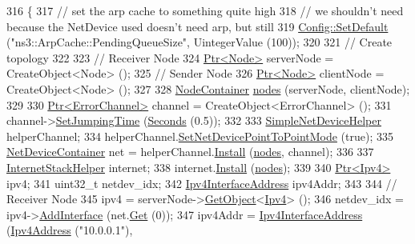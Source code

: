 \begin{DoxyCode}
316 \{
317   \textcolor{comment}{// set the arp cache to something quite high}
318   \textcolor{comment}{// we shouldn't need because the NetDevice used doesn't need arp, but still}
319   \hyperlink{group__config_ga2e7882df849d8ba4aaad31c934c40c06}{Config::SetDefault} (\textcolor{stringliteral}{"ns3::ArpCache::PendingQueueSize"}, UintegerValue (100));
320 
321   \textcolor{comment}{// Create topology}
322   
323    \textcolor{comment}{// Receiver Node}
324   \hyperlink{classns3_1_1Ptr}{Ptr<Node>} serverNode = CreateObject<Node> ();
325   \textcolor{comment}{// Sender Node}
326   \hyperlink{classns3_1_1Ptr}{Ptr<Node>} clientNode = CreateObject<Node> ();
327 
328   \hyperlink{classns3_1_1NodeContainer}{NodeContainer} \hyperlink{visualizer-ideas_8txt_a3e1b3808014a2c68ab0cd0182e041be2}{nodes} (serverNode, clientNode);
329 
330   \hyperlink{classns3_1_1Ptr}{Ptr<ErrorChannel>} channel = CreateObject<ErrorChannel> ();
331   channel->\hyperlink{classns3_1_1ErrorChannel_a907fdc086d939d84eb4e612d0eac1d84}{SetJumpingTime} (\hyperlink{group__timecivil_ga33c34b816f8ff6628e33d5c8e9713b9e}{Seconds} (0.5));
332 
333   \hyperlink{classns3_1_1SimpleNetDeviceHelper}{SimpleNetDeviceHelper} helperChannel;
334   helperChannel.\hyperlink{classns3_1_1SimpleNetDeviceHelper_a474460ba6942d4933f443a97df7d4716}{SetNetDevicePointToPointMode} (\textcolor{keyword}{true});
335   \hyperlink{classns3_1_1NetDeviceContainer}{NetDeviceContainer} net = helperChannel.\hyperlink{classns3_1_1SimpleNetDeviceHelper_a35bed9cee32d306362d3e24dfeef4513}{Install} (\hyperlink{visualizer-ideas_8txt_a3e1b3808014a2c68ab0cd0182e041be2}{nodes}, channel);
336 
337   \hyperlink{classns3_1_1InternetStackHelper}{InternetStackHelper} internet;
338   internet.\hyperlink{classns3_1_1InternetStackHelper_a6645b412f31283d2d9bc3d8a95cebbc0}{Install} (\hyperlink{visualizer-ideas_8txt_a3e1b3808014a2c68ab0cd0182e041be2}{nodes});
339 
340   \hyperlink{classns3_1_1Ptr}{Ptr<Ipv4>} ipv4;
341   uint32\_t netdev\_idx;
342   \hyperlink{classns3_1_1Ipv4InterfaceAddress}{Ipv4InterfaceAddress} ipv4Addr;
343 
344   \textcolor{comment}{// Receiver Node}
345   ipv4 = serverNode->\hyperlink{classns3_1_1Object_a13e18c00017096c8381eb651d5bd0783}{GetObject}<\hyperlink{classns3_1_1Ipv4}{Ipv4}> ();
346   netdev\_idx = ipv4->\hyperlink{classns3_1_1Ipv4_a637354128b71bc587ea5a6eeaef42469}{AddInterface} (net.\hyperlink{classns3_1_1NetDeviceContainer_a677d62594b5c9d2dea155cc5045f4d0b}{Get} (0));
347   ipv4Addr = \hyperlink{classns3_1_1Ipv4InterfaceAddress}{Ipv4InterfaceAddress} (\hyperlink{classns3_1_1Ipv4Address}{Ipv4Address} (\textcolor{stringliteral}{"10.0.0.1"}), 

\end{DoxyCode}
